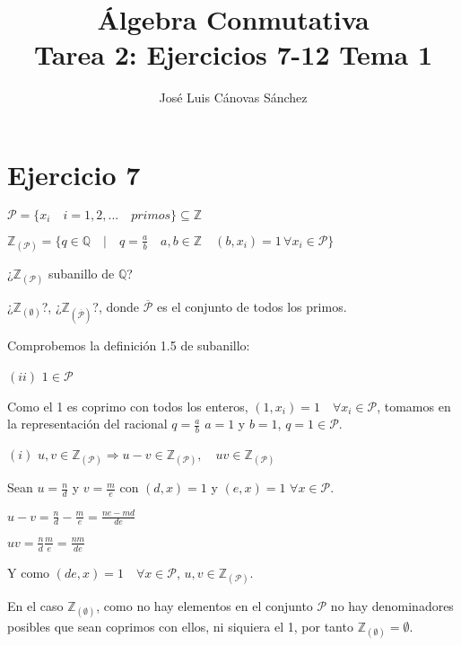 \documentclass[10pt,a4paper]{article}
\author{José Luis Cánovas Sánchez}
\title{Álgebra Conmutativa\\Tarea 2: Ejercicios 7-12 Tema 1}
\begin{document}
	\maketitle
	
	\section*{Ejercicio 7}
	
	$\mathcal{P} = \{ x_i  \quad i=1,2,... \quad primos \}  \subseteq \mathbb{Z} $
	
	$\mathbb{Z}_{\left( \mathcal{P} \right)}  = \{ q \in \mathbb{Q} \quad \vert \quad q = \frac{a}{b} \quad a, b \in \mathbb{Z}   \quad (b,x_i) = 1  \, \forall x_i \in \mathcal{P}  \}$
	
	¿$ \mathbb{Z}_{\left( \mathcal{P} \right)} $ subanillo de $\mathbb{Q}$? 
	
	¿$\mathbb{Z}_{\left( \emptyset \right)} $?,  ¿$\mathbb{Z}_{\left( \overline{\mathcal{P}} \right)} $?, donde $\overline{\mathcal{P}}$ es el conjunto de todos los primos.
	
	
	\hfill
	
	Comprobemos la definición 1.5 de subanillo:
	
	$(ii)$ $1\in \mathcal{P}$ 
	
	Como el 1 es coprimo con todos los enteros, $(1, x_i) = 1 \quad \forall x_i \in \mathcal{P}$, tomamos en la representación del racional $q=\frac{a}{b}$ $a=1$ y $b=1$, $q=1\in \mathcal{P}$.

	\hfil
	
	$(i)$ $u, v\in \mathbb{Z}_{\left( \mathcal{P} \right)} \Rightarrow u-v \in \mathbb{Z}_{\left( \mathcal{P} \right)} , \quad  uv \in \mathbb{Z}_{\left( \mathcal{P} \right)} $
	
	Sean $u=\frac{n}{d}$ y $v=\frac{m}{e}$ con $(d,x)=1$ y $(e,x)=1$ $\forall x \in \mathcal{P}$.
	
	$u-v = \frac{n}{d} - \frac{m}{e} = \frac{ne - md}{de}$
	
	$uv = \frac{n}{d}  \frac{m}{e} = \frac{nm}{de}$
	
	Y como $(de, x) = 1 \quad \forall x \in \mathcal{P}$, $u,v\in \mathbb{Z}_{\left( \mathcal{P} \right)} $.
	
	
	\hfill
	
	En el caso $\mathbb{Z}_{\left( \emptyset \right)}$, como no hay elementos en el conjunto $\mathcal{P}$ no hay denominadores posibles que sean coprimos con ellos, ni siquiera el 1, por tanto $\mathbb{Z}_{\left( \emptyset \right)} = \emptyset$.
	
\end{document}
